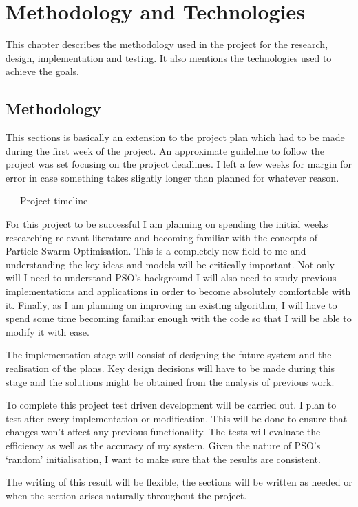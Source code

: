 \documentclass{pdfmx4020}
\begin{document}

\chapter{Methodology and Technologies}
  This chapter describes the methodology used in the project for the research, design, implementation and testing. It also mentions the technologies used to achieve the goals. 
  \section{Methodology} %
  \label{sec:methodology}
  This sections is basically an extension to the project plan which had to be made during the first week of the project. An approximate guideline to follow the project was set focusing on the project deadlines. I left a few weeks for margin for error in case something takes slightly longer than planned for whatever reason. 

   -----Project timeline-----

  For this project to be successful I am planning on spending the initial weeks researching relevant literature and becoming familiar with the concepts of Particle Swarm Optimisation. This is a completely new field to me and understanding the key ideas and models will be critically important. Not only will I need to understand PSO's background I will also need to study previous implementations and applications in order to become absolutely comfortable with it. Finally, as I am planning on improving an existing algorithm, I will have to spend some time becoming familiar enough with the code so that I will be able to modify it with ease.

  The implementation stage will consist of designing the future system and the realisation of the plans. Key design decisions will have to be made during this stage and the solutions might be obtained from the analysis of previous work. 

  To complete this project test driven development will be carried out. I plan to test after every implementation or modification. This will be done to ensure that changes won't affect any previous functionality. The tests will evaluate the efficiency as well as the accuracy of my system. Given the nature of PSO's `random' initialisation,  I want to make sure that the results are consistent. 

  The writing of this result will be flexible, the sections will be written as needed or when the section arises naturally throughout the project. 
\end{document}

